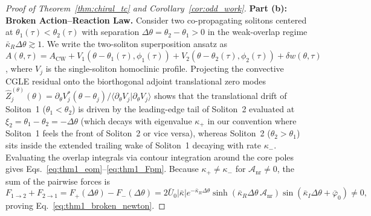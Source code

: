 \documentclass[11pt,letterpaper]{article}
\begin{document}
\begin{proof}[Proof of Theorem~\ref{thm:chiral_tc} and Corollary~\ref{cor:odd_work}]
\textbf{Part (b): Broken Action--Reaction Law.}
Consider two co-propagating solitons centered at $\theta_1(\tau) < \theta_2(\tau)$ with separation $\Delta\theta = \theta_2 - \theta_1 > 0$ in the weak-overlap regime $\bar{\kappa}_R\Delta\theta \gtrsim 1$. We write the two-soliton superposition ansatz as $A(\theta, \tau) = A_{\mathrm{CW}} + V_1(\theta - \theta_1(\tau), \phi_1(\tau)) + V_2(\theta - \theta_2(\tau), \phi_2(\tau)) + \delta w(\theta, \tau)$, where $V_j$ is the single-soliton homoclinic profile. Projecting the convective CGLE residual onto the biorthogonal adjoint translational zero modes $\hat{Z}_j^{(\theta)}(\theta) = \partial_\theta V_j^*(\theta - \theta_j) / \langle \partial_\theta V_j | \partial_\theta V_j \rangle$ shows that the translational drift of Soliton~1 ($\theta_1 < \theta_2$) is driven by the leading-edge tail of Soliton~2 evaluated at $\xi_2 = \theta_1 - \theta_2 = -\Delta\theta$ (which decays with eigenvalue $\kappa_+$ in our convention where Soliton~1 feels the front of Soliton~2 or vice versa), whereas Soliton~2 ($\theta_2 > \theta_1$) sits inside the extended trailing wake of Soliton~1 decaying with rate $\kappa_-$. Evaluating the overlap integrals via contour integration around the core poles gives Eqs.~\eqref{eq:thm1_eom}--\eqref{eq:thm1_Fpm}. Because $\kappa_+ \neq \kappa_-$ for $\mathcal{A}_{\mathrm{nr}} \neq 0$, the sum of the pairwise forces is
\begin{equation}
F_{1\to 2} + F_{2\to 1} = F_+(\Delta\theta) - F_-(\Delta\theta) = 2\bar{U}_0|\bar{\kappa}|e^{-\bar{\kappa}_R\Delta\theta}\sinh\!\left(\bar{\kappa}_R\Delta\theta\,\mathcal{A}_{\mathrm{nr}}\right)\sin(\bar{\kappa}_I\Delta\theta + \bar{\varphi}_0) \neq 0,
\end{equation}
proving Eq.~\eqref{eq:thm1_broken_newton}.


\end{proof}
\end{document}
